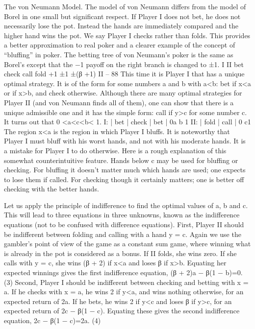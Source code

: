 The von Neumann Model. The model of von Neumann differs from the model of
Borel in one small but significant respect. If Player I does not bet, he does not necessarily
lose the pot. Instead the hands are immediately compared and the higher hand wins the
pot. We say Player I checks rather than folds. This provides a better approximation to
real poker and a clearer example of the concept of “bluffing” in poker. The betting tree of
von Neumann’s poker is the same as Borel’s except that the −1 payoff on the right branch
is changed to ±1.
I
II
bet check
call fold
+1
±1
±(β +1)
II – 88
This time it is Player I that has a unique optimal strategy. It is of the form for some
numbers a and b with a<b: bet if x<a or if x>b, and check otherwise. Although there
are many optimal strategies for Player II (and von Neumann finds all of them), one can
show that there is a unique admissible one and it has the simple form: call if y>c for
some number c. It turns out that 0 <a<c<b< 1.
I: | bet | check | bet |
0a b 1
II: | fold | call |
0 c1
The region x<a is the region in which Player I bluffs. It is noteworthy that Player
I must bluff with his worst hands, and not with his moderate hands. It is a mistake for
Player I to do otherwise. Here is a rough explanation of this somewhat counterintuitive
feature. Hands below c may be used for bluffing or checking. For bluffing it doesn’t matter
much which hands are used; one expects to lose them if called. For checking though it
certainly matters; one is better off checking with the better hands.

Let us apply the principle of indifference to find the optimal values of a, b and c. This
will lead to three equations in three unknowns, known as the indifference equations (not
to be confused with difference equations). First, Player II should be indifferent between
folding and calling with a hand y = c. Again we use the gambler’s point of view of the
game as a constant sum game, where winning what is already in the pot is considered as
a bonus. If II folds, she wins zero. If she calls with y = c, she wins (β + 2) if x<a and
loses β if x>b. Equating her expected winnings gives the first indifference equation,
(β + 2)a − β(1 − b)=0. (3)
Second, Player I should be indifferent between checking and betting with x = a. If
he checks with x = a, he wins 2 if y<a, and wins nothing otherwise, for an expected
return of 2a. If he bets, he wins 2 if y<c and loses β if y>c, for an expected return of
2c − β(1 − c). Equating these gives the second indifference equation,
2c − β(1 − c)=2a. (4)

